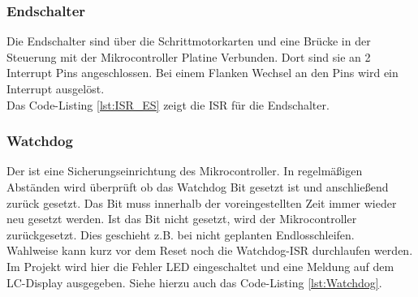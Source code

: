 \subsubsection{Endschalter}
Die Endschalter sind über die Schrittmotorkarten und eine Brücke in der Steuerung mit der Mikrocontroller Platine Verbunden. Dort sind sie an 2 Interrupt Pins angeschlossen. Bei einem Flanken Wechsel an den Pins wird ein Interrupt ausgelöst. \\
Das Code-Listing \ref{lst:ISR_ES} zeigt die ISR für die Endschalter.
\lstset{language=Java, basicstyle=\footnotesize, showstringspaces=false, tabsize=2}

\subsubsection{Watchdog}
Der  ist eine Sicherungseinrichtung des Mikrocontroller. In regelmäßigen Abständen wird überprüft ob das Watchdog Bit gesetzt ist und anschließend zurück gesetzt. Das Bit muss innerhalb der voreingestellten Zeit immer wieder neu gesetzt werden. Ist das Bit nicht gesetzt, wird der Mikrocontroller zurückgesetzt. Dies geschieht z.B. bei nicht geplanten Endlosschleifen.\\
Wahlweise kann kurz vor dem Reset noch die Watchdog-ISR durchlaufen werden.\\
Im Projekt wird hier die Fehler LED eingeschaltet und eine Meldung auf dem LC-Display ausgegeben. Siehe hierzu auch das Code-Listing \ref{lst:Watchdog}.
\lstset{language=Java, basicstyle=\footnotesize, showstringspaces=false, tabsize=4}

